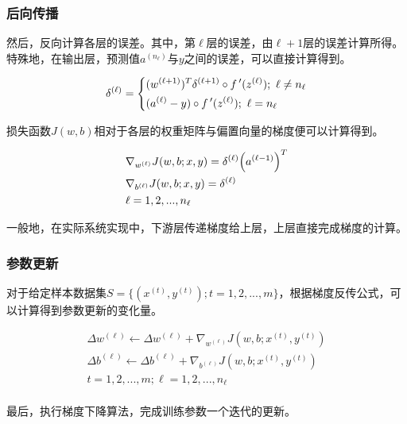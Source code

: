 \begin{content}
\begin{content}
\subsubsection{后向传播}

然后，反向计算各层的误差。其中，第$\ell$层的误差，由$\ell + 1$层的误差计算所得。特殊地，在输出层，预测值$a^{({n_\ell })}$与$y$之间的误差，可以直接计算得到。

\[{\delta ^{(\ell)}} = \left\{ \begin{gathered}
  {({w^{(\ell + 1)}})^T}{\delta ^{(\ell + 1)}} \circ f\,'({z^{(\ell)}});{\text{  }}\ell \ne {n_\ell} \hfill \\
  ({a^{(\ell)}} - y) \circ f\,'({z^{(\ell)}}); {\text{  }}\ell = {n_\ell} \hfill \\ 
\end{gathered}  \right.\]

损失函数$J(w,b)$相对于各层的权重矩阵与偏置向量的梯度便可以计算得到。

\[\begin{gathered}
  {\nabla _{{w^{(\ell )}}}}J(w,b;x,y) = {\delta ^{(\ell )}}{\left( {{a^{(\ell  - 1)}}} \right)^T} \hfill \\
  {\nabla _{{b^{(\ell )}}}}J(w,b;x,y) = {\delta ^{(\ell )}} \hfill \\
  \ell  = 1,2,...,{n_\ell } \hfill \\ 
\end{gathered} \]

一般地，在实际系统实现中，下游层传递梯度给上层，上层直接完成梯度的计算。

\subsubsection{参数更新}

对于给定样本数据集$ S = \{ ({x^{(t)}},{y^{(t)}});t = 1,2,...,m\} $，根据梯度反传公式，可以计算得到参数更新的变化量。

\[\begin{aligned}
  \Delta {w^{(\ell )}} \leftarrow \Delta {w^{(\ell )}} + {\nabla _{{w^{(\ell )}}}}J\left( {w,b;{x^{(t)}},{y^{(t)}}} \right) \\ 
  \Delta {b^{(\ell )}} \leftarrow \Delta {b^{(\ell )}} + {\nabla _{{b^{(\ell )}}}}J\left( {w,b;{x^{(t)}},{y^{(t)}}} \right) \\ 
  t = 1,2,...,m;\ell  = 1,2,...,{n_\ell } \\ 
\end{aligned} \]

最后，执行梯度下降算法，完成训练参数一个迭代的更新。


\end{content}
\end{content}
